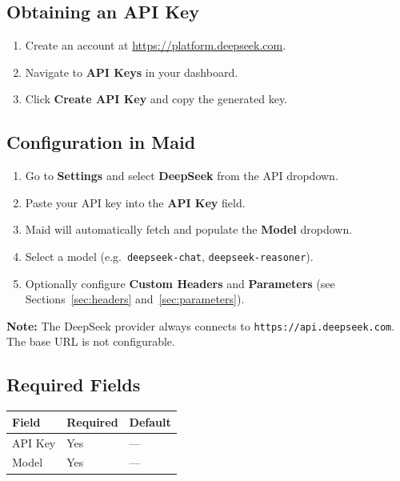 \documentclass[12pt,a4paper]{article}
\begin{document}
\subsection{Obtaining an API Key}

\begin{enumerate}
    \item Create an account at \url{https://platform.deepseek.com}.
    \item Navigate to \textbf{API Keys} in your dashboard.
    \item Click \textbf{Create API Key} and copy the generated key.
\end{enumerate}

\subsection{Configuration in Maid}

\begin{enumerate}
    \item Go to \textbf{Settings} and select \textbf{DeepSeek} from the API dropdown.
    \item Paste your API key into the \textbf{API Key} field.
    \item Maid will automatically fetch and populate the \textbf{Model} dropdown.
    \item Select a model (e.g.\ \texttt{deepseek-chat}, \texttt{deepseek-reasoner}).
    \item Optionally configure \textbf{Custom Headers} and \textbf{Parameters} (see Sections~\ref{sec:headers} and~\ref{sec:parameters}).
\end{enumerate}

\textbf{Note:} The DeepSeek provider always connects to \texttt{https://api.deepseek.com}. The base URL is not configurable.

\subsection{Required Fields}

\begin{center}
\begin{tabular}{lll}
\toprule
\textbf{Field} & \textbf{Required} & \textbf{Default} \\
\midrule
API Key & Yes & — \\
Model   & Yes & — \\
\bottomrule
\end{tabular}
\end{center}
\end{document}
